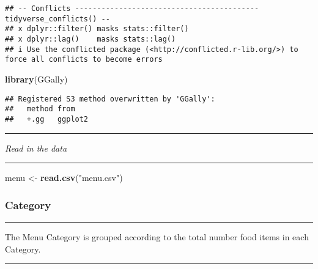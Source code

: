 \documentclass[
]{article}
\newenvironment{Shaded}{\begin{snugshade}}{\end{snugshade}}
\newcommand{\FunctionTok}[1]{\textcolor[rgb]{0.13,0.29,0.53}{\textbf{#1}}}
\newcommand{\NormalTok}[1]{#1}
\newcommand{\OtherTok}[1]{\textcolor[rgb]{0.56,0.35,0.01}{#1}}
\newcommand{\StringTok}[1]{\textcolor[rgb]{0.31,0.60,0.02}{#1}}
\begin{document}
\begin{verbatim}
## -- Conflicts ------------------------------------------ tidyverse_conflicts() --
## x dplyr::filter() masks stats::filter()
## x dplyr::lag()    masks stats::lag()
## i Use the conflicted package (<http://conflicted.r-lib.org/>) to force all conflicts to become errors
\end{verbatim}

\begin{Shaded}
\begin{Highlighting}[]
\FunctionTok{library}\NormalTok{(GGally)}
\end{Highlighting}
\end{Shaded}

\begin{verbatim}
## Registered S3 method overwritten by 'GGally':
##   method from   
##   +.gg   ggplot2
\end{verbatim}

\begin{center}\rule{0.5\linewidth}{0.5pt}\end{center}

\emph{Read in the data}

\begin{center}\rule{0.5\linewidth}{0.5pt}\end{center}

\begin{Shaded}
\begin{Highlighting}[]
\NormalTok{menu }\OtherTok{\textless{}{-}} \FunctionTok{read.csv}\NormalTok{(}\StringTok{"menu.csv"}\NormalTok{)}
\end{Highlighting}
\end{Shaded}

\hypertarget{category}{%
\subsubsection{Category}\label{category}}

\begin{center}\rule{0.5\linewidth}{0.5pt}\end{center}

The Menu Category is grouped according to the total number food items in
each Category.

\begin{center}\rule{0.5\linewidth}{0.5pt}\end{center}
\end{document}
